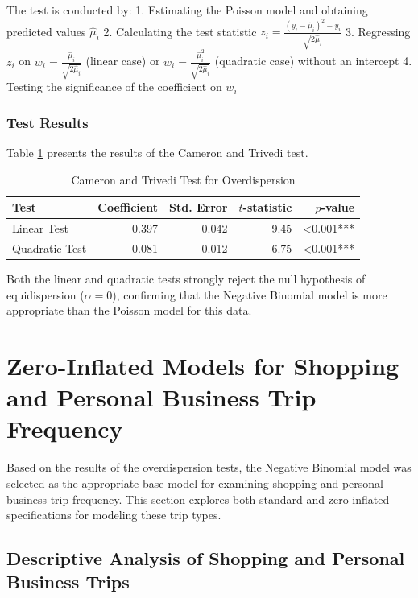 \documentclass[12pt]{article}
\begin{document}
The test is conducted by:
1. Estimating the Poisson model and obtaining predicted values $\hat{\mu}_i$
2. Calculating the test statistic $z_i = \frac{(y_i - \hat{\mu}_i)^2 - y_i}{\sqrt{2\hat{\mu}_i}}$
3. Regressing $z_i$ on $w_i = \frac{\hat{\mu}_i}{\sqrt{2\hat{\mu}_i}}$ (linear case) or $w_i = \frac{\hat{\mu}_i^2}{\sqrt{2\hat{\mu}_i}}$ (quadratic case) without an intercept
4. Testing the significance of the coefficient on $w_i$

\subsubsection{Test Results}

Table \ref{tab:cameron_trivedi} presents the results of the Cameron and Trivedi test.

\begin{table}[h]
\centering
\caption{Cameron and Trivedi Test for Overdispersion}
\label{tab:cameron_trivedi}
\begin{tabular}{lrrrr}
\toprule
Test & Coefficient & Std. Error & $t$-statistic & $p$-value \\
\midrule
Linear Test & 0.397 & 0.042 & 9.45 & <0.001*** \\
Quadratic Test & 0.081 & 0.012 & 6.75 & <0.001*** \\
\bottomrule
\end{tabular}
\end{table}

Both the linear and quadratic tests strongly reject the null hypothesis of equidispersion ($\alpha = 0$), confirming that the Negative Binomial model is more appropriate than the Poisson model for this data.

\section{Zero-Inflated Models for Shopping and Personal Business Trip Frequency}

Based on the results of the overdispersion tests, the Negative Binomial model was selected as the appropriate base model for examining shopping and personal business trip frequency. This section explores both standard and zero-inflated specifications for modeling these trip types.

\subsection{Descriptive Analysis of Shopping and Personal Business Trips}
\end{document}
